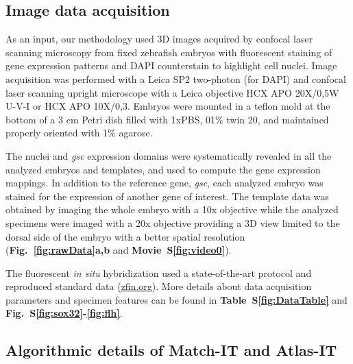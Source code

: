 \subsection*{Image data acquisition}
\label{subsec:ImageData}

As an input, our methodology used 3D images acquired by confocal laser scanning microscopy from fixed zebrafish embryos with fluorescent staining of gene expression patterns and DAPI counterstain to highlight cell nuclei. Image acquisition was performed with a Leica SP2 two-photon (for DAPI) and confocal laser scanning upright microscope with a Leica objective HCX APO 20X/0,5W U-V-I or HCX APO 10X/0,3. Embryos were mounted in a teflon mold at the bottom of a 3 cm Petri dish filled with 1xPBS, 01\% twin 20, and maintained properly oriented with 1\% agarose.

The nuclei and \emph{gsc} expression domains were systematically revealed in all the analyzed embryos and templates, and used to compute the gene expression mappings. In addition to the reference gene, \emph{gsc}, each analyzed embryo was stained for the expression of another gene of interest. The template data was obtained by imaging the whole embryo with a 10x objective while the analyzed specimens were imaged with a 20x objective providing a 3D view limited to the dorsal side of the embryo with a better spatial resolution (\textbf{Fig.~\ref{fig:rawData}a,b} and \textbf{Movie~S\ref{fig:video0}}).

The fluorescent \emph{in situ} hybridization used a state-of-the-art protocol\cite{brend2009zebrafish} and reproduced standard data (\href{zfin.org}{zfin.org}). More details about data acquisition parameters and specimen features can be found in \textbf{Table~S\ref{fig:DataTable}} and \textbf{Fig.~S\ref{fig:sox32}-\ref{fig:flh}}.

\subsection*{Algorithmic details of Match-IT and Atlas-IT}
\label{sec:MatchIT_details}

